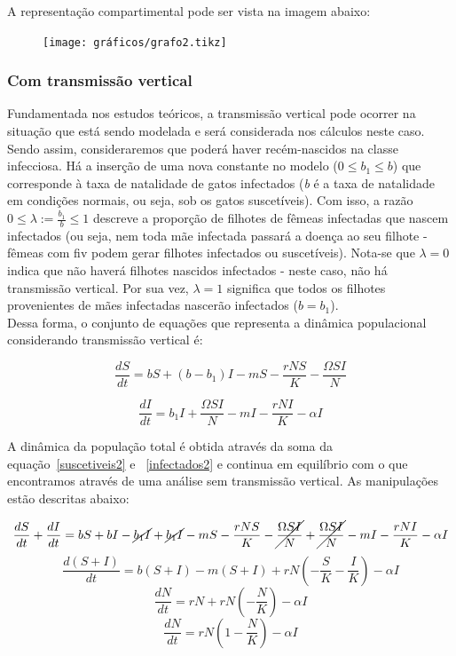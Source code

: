 \documentclass{article}
\begin{document}
A representação compartimental pode ser vista na imagem abaixo:

\begin{figure}[!ht]
\centering
\texttt{[image: gráficos/grafo2.tikz]}
\end{figure}
 
\subsubsection{Com transmissão vertical}
Fundamentada nos estudos teóricos, a transmissão vertical pode ocorrer na situação que está sendo modelada e será considerada nos cálculos neste caso. Sendo assim, consideraremos que poderá haver recém-nascidos na classe infecciosa. Há a inserção de uma nova constante no modelo ({\it $0 \leq b_1 \leq b$}) que corresponde à taxa de natalidade de gatos infectados ({\it b} é a taxa de natalidade em condições normais, ou seja, sob os gatos suscetíveis). Com isso, a razão $0 \leq \lambda := \frac{b_1}{b} \leq 1$ descreve a proporção de filhotes de fêmeas infectadas que nascem infectados (ou seja, nem toda mãe infectada passará a doença ao seu filhote - fêmeas com \gls{fiv} podem gerar filhotes infectados ou suscetíveis). Nota-se que $\lambda = 0$ indica que não haverá filhotes nascidos infectados - neste caso, não há transmissão vertical. Por sua vez, $\lambda = 1$ significa que todos os filhotes provenientes de mães infectadas nascerão infectados ($b = b_1$).\\


\noindent Dessa forma, o conjunto de equações que representa a dinâmica populacional considerando transmissão vertical é:

\begin{equation} \label{suscetiveis2}
 \frac{dS}{dt}= bS + (b - b_1)I- mS - \frac{rNS}{K} - \frac{\Omega SI}{N}
\end{equation}

\begin{equation} \label{infectados2}
 \frac{dI}{dt}=  b_1I + \frac{\Omega SI}{N} - mI - \frac{rNI}{K} - \alpha I
\end{equation}

\noindent A dinâmica da população total é obtida através da soma da equação~\ref{suscetiveis2} e ~\ref{infectados2} e continua em equilíbrio com o que encontramos através de uma análise sem transmissão vertical. As manipulações estão descritas abaixo:

$$\frac{dS}{dt} + \frac{dI}{dt} = bS + bI - \cancel{b_1I} + \cancel{b_1I} - mS - \frac{rNS}{K} - \cancel{\frac{\Omega SI}{N}} + \cancel{\frac{\Omega SI}{N}} - mI - \frac{rNI}{K} - \alpha I $$
$$\frac{d(S + I)}{dt} = b(S + I) -m(S + I) + rN(-\frac{S}{K} -\frac{I}{K}) - \alpha I $$
$$\frac{dN}{dt} = rN + rN(-\frac{N}{K}) - \alpha I $$
$$\frac{dN}{dt} =  rN(1 -\frac{N}{K}) - \alpha I  $$\\
\end{document}
